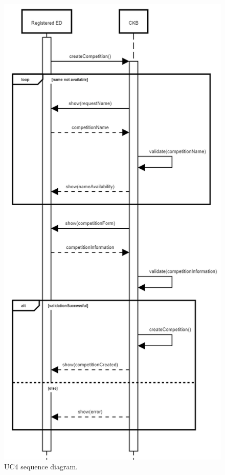 \begin{center}
  \begin{figure} [H]
    \begin{center}
        \includegraphics[width=\textwidth,height=\textheight,keepaspectratio]{Images/SequenceDiagrams/UC4.png}
        \caption{UC4 sequence diagram.}
        \label{fig: UC4_sequence_diagram}
    \end{center}
  \end{figure}
\end{center}

